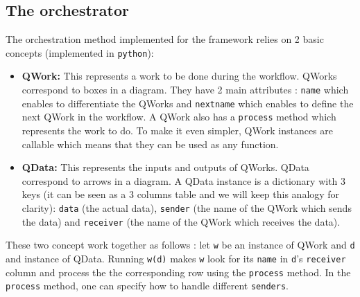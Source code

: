\documentclass[10pt, conference, compsocconf]{IEEEtran}
\begin{document}
\subsection{The orchestrator}
The orchestration method implemented for the framework relies on 2 basic concepts (implemented in \texttt{python}): 
\begin{itemize}
\item \textbf{QWork:} This represents a work to be done during the workflow. QWorks correspond to boxes in a diagram. They have 2 main attributes : \texttt{name} which enables to differentiate the QWorks and \texttt{nextname} which enables to define the next QWork in the workflow. A QWork also has a \texttt{process} method which represents the work to do. To make it even simpler, QWork instances are callable which means that they can be used as any function. 
\item \textbf{QData:} This represents the inputs and outputs of QWorks. QData correspond to arrows in a diagram. A QData instance is a dictionary with 3 keys (it can be seen as a 3 columns table and we will keep this analogy for clarity): \texttt{data} (the actual data), \texttt{sender} (the name of the QWork which sends the data) and \texttt{receiver} (the name of the QWork which receives the data). 
\end{itemize}
These two concept work together as follows : let \texttt{w} be an instance of QWork and \texttt{d} and instance of QData. Running \texttt{w(d)} makes \texttt{w} look for its \texttt{name} in \texttt{d}'s \texttt{receiver} column and process the the corresponding row using the \texttt{process} method. In the \texttt{process} method, one can specify how to handle different \texttt{senders}.
\end{document}
